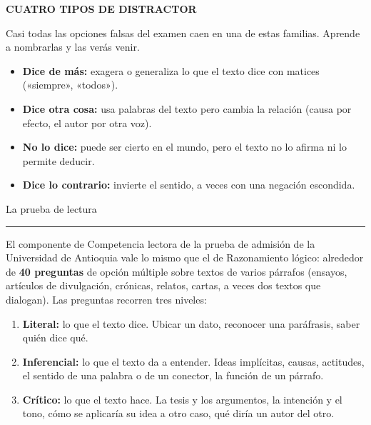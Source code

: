 \vspace{6pt}
\begin{tcolorbox}[enhanced,colback=zsoft,coltext=zink,boxrule=0pt,arc=3pt,left=5mm,right=5mm,top=3mm,bottom=3mm]
{\sffamily\scriptsize\bfseries\color{zolive}CUATRO TIPOS DE DISTRACTOR}\par\vspace{3pt}
\small Casi todas las opciones falsas del examen caen en una de estas familias. Aprende a nombrarlas y las verás venir.
\begin{itemize}
  \item[\color{zolive}1] \textbf{Dice de más:} exagera o generaliza lo que el texto dice con matices («siempre», «todos»).
  \item[\color{zolive}2] \textbf{Dice otra cosa:} usa palabras del texto pero cambia la relación (causa por efecto, el
  autor por otra voz).
  \item[\color{zolive}3] \textbf{No lo dice:} puede ser cierto en el mundo, pero el texto no lo afirma ni lo permite
  deducir.
  \item[\color{zolive}4] \textbf{Dice lo contrario:} invierte el sentido, a veces con una negación escondida.
\end{itemize}
\end{tcolorbox}

\clearpage
\thispagestyle{vacia}
{\sffamily\fontsize{26}{30}\selectfont\firalight La prueba de lectura\par}\vspace{2pt}
{\color{zolive}\rule{18mm}{1.6pt}}\par\vspace{8pt}

El componente de Competencia lectora de la prueba de admisión de la Universidad de Antioquia vale lo mismo que el de
Razonamiento lógico: alrededor de \textbf{40 preguntas} de opción múltiple sobre textos de varios párrafos (ensayos,
artículos de divulgación, crónicas, relatos, cartas, a veces dos textos que dialogan). Las preguntas recorren tres niveles:

\begin{enumerate}[leftmargin=1.6em,itemsep=4pt]
  \item \textbf{Literal:} lo que el texto dice. Ubicar un dato, reconocer una paráfrasis, saber quién dice qué.
  \item \textbf{Inferencial:} lo que el texto da a entender. Ideas implícitas, causas, actitudes, el sentido de una palabra o
  de un conector, la función de un párrafo.
  \item \textbf{Crítico:} lo que el texto hace. La tesis y los argumentos, la intención y el tono, cómo se aplicaría su idea
  a otro caso, qué diría un autor del otro.
\end{enumerate}

